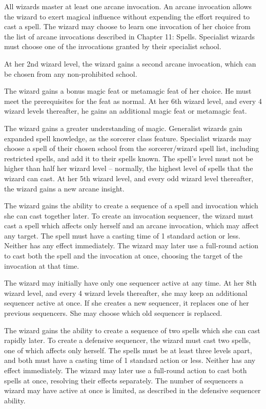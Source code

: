  All wizards master at least one arcane invocation. An arcane invocation allows the wizard to exert magical influence without expending the effort required to cast a spell. The wizard may choose to learn one invocation of her choice from the list of arcane invocations described in Chapter 11: Spells. Specialist wizards must choose one of the invocations granted by their specialist school.

At her 2nd wizard level, the wizard gains a second arcane invocation, which can be chosen from any non-prohibited school.

 The wizard gains a bonus magic feat or metamagic feat of her choice. He must meet the prerequisites for the feat as normal. At her 6th wizard level, and every 4 wizard levels thereafter, he gains an additional magic feat or metamagic feat.

 The wizard gains a greater understanding of magic. Generalist wizards gain expanded spell knowledge, as the sorcerer class feature. Specialist wizards may choose a spell of their chosen school from the sorcerer/wizard spell list, including restricted spells, and add it to their spells known. The spell's level must not be higher than half her wizard level -- normally, the highest level of spells that the wizard can cast. At her 5th wizard level, and every odd wizard level thereafter, the wizard gains a new arcane insight.

 The wizard gains the ability to create a sequence of a spell and invocation which she can cast together later. To create an invocation sequencer, the wizard must cast a spell which affects only herself and an arcane invocation, which may affect any target. The spell must have a casting time of 1 standard action or less. Neither has any effect immediately. The wizard may later use a full-round action to cast both the spell and the invocation at once, choosing the target of the invocation at that time.
\par The wizard may initially have only one sequencer active at any time. At her 8th wizard level, and every 4 wizard levels thereafter, she may keep an additional sequencer active at once. If she creates a new sequencer, it replaces one of her previous sequencers. She may choose which old sequencer is replaced.

 The wizard gains the ability to create a sequence of two spells which she can cast rapidly later. To create a defensive sequencer, the wizard must cast two spells, one of which affects only herself. The spells must be at least three levels apart, and both must have a casting time of 1 standard action or less. Neither has any effect immediately. The wizard may later use a full-round action to cast both spells at once, resolving their effects separately. The number of sequencers a wizard may have active at once is limited, as described in the defensive sequencer ability.

